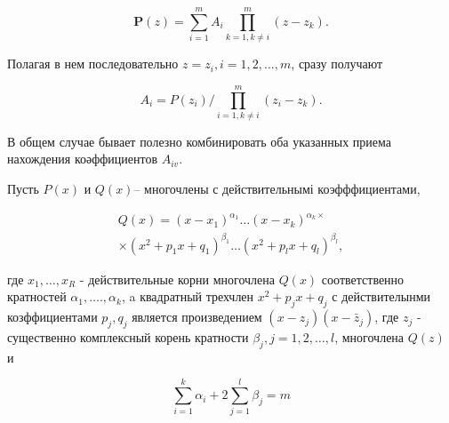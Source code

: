 \documentclass[10pt]{article}
\begin{document}
\[

\boldsymbol{P}(z)=\sum_{i=1}^{m} A_{i} \prod_{k=1, k \neq i}^{m}\left(z-z_{k}\right) .

\]



Полагая в нем последовательно $z=z_{i}, i=1,2, \ldots, m$, сразу получают



\[

A_{i}=P\left(z_{i}\right) / \prod_{i=1, k \neq i}^{m}\left(z_{i}-z_{k}\right) .

\]



В общем случае бывает полезно комбинировать оба указанных приема нахождения коәффициентов $A_{i v}$.



Пусть $P(x)$ и $Q(x)$-- многочлены с действительнымі коэфффициентами,



\[

\begin{gathered}

Q(x)=\left(x-x_{1}\right)^{\alpha_{1}} \ldots\left(x-x_{k}\right)^{\alpha_{k} \times} \\

\times\left(x^{2}+p_{1} x+q_{1}\right)^{\beta_{1}} \ldots\left(x^{2}+p_{l} x+q_{l}\right)^{\beta_{l}},

\end{gathered}

\]



где $x_{1}, \ldots, x_{R}$ - действительные корни многочлена $Q(x)$ соответственно кратностей $\alpha_{1}, \ldots ., \alpha_{k}$, a квадратный трехчлен $x^{2}+p_{j} x+q_{j}$ с действителынми козффициентами $p_{j}, q_{j}$ является произведением $\left(x-z_{j}\right)\left(x-\bar{z}_{j}\right)$, где $z_{j}$ - существенно комплексный корень кратности $\beta_{j}, j=1,2, \ldots, l$, многочлена $Q(z)$ и



\[

\sum_{i=1}^{k} \alpha_{i}+2 \sum_{j=1}^{l} \beta_{j}=m

\]
\end{document}
